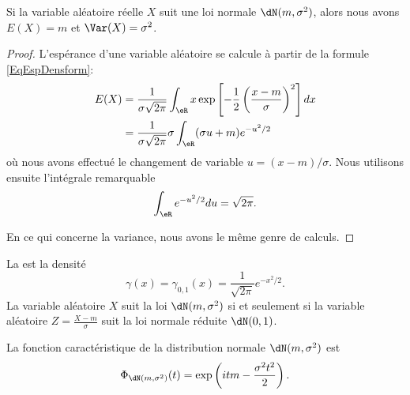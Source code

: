 \begin{proposition}
	Si la variable aléatoire réelle \( X\) suit une loi normale \( \dN(m,\sigma^2)\), alors nous avons \( E(X)=m\) et \( \Var(X)=\sigma^2\).
\end{proposition}

\begin{proof}
	L'espérance d'une variable aléatoire se calcule à partir de la formule \eqref{EqEspDensform}:
	\begin{subequations}
		\begin{align}
			E(X) & =\frac{1}{ \sigma\sqrt{2\pi} }\int_{\eR}x\exp\left[ -\frac{1}{ 2 }\left( \frac{ x-m }{ \sigma } \right)^2 \right]dx \\
			     & =\frac{1}{ \sigma\sqrt{2\pi} }\sigma\int_{\eR}(\sigma u+m) e^{-u^2/2}
		\end{align}
	\end{subequations}
	où nous avons effectué le changement de variable \( u=(x-m)/\sigma\). Nous utilisons ensuite l'intégrale remarquable
	\begin{equation}
		\int_{\eR} e^{-u^2/2}du=\sqrt{2\pi}.
	\end{equation}

	En ce qui concerne la variance, nous avons le même genre de calculs.
\end{proof}

La  est la densité
\begin{equation}
	\gamma(x)=\gamma_{0,1}(x)=\frac{1}{ \sqrt{2\pi} } e^{-x^2/2}.
\end{equation}
La variable aléatoire \( X\) suit la loi \( \dN(m,\sigma^2)\) si et seulement si la variable aléatoire \( Z=\frac{ X-m }{ \sigma }\) suit la loi normale réduite \( \dN(0,1)\).

\begin{proposition}     \label{PropFnCaractNorm}
	La fonction caractéristique de la distribution normale \( \dN(m,\sigma^2)\) est
	\begin{equation}
		\Phi_{\dN(m,\sigma^2)}(t)=\exp\left( itm-\frac{ \sigma^2t^2 }{ 2 } \right).
	\end{equation}
\end{proposition}


